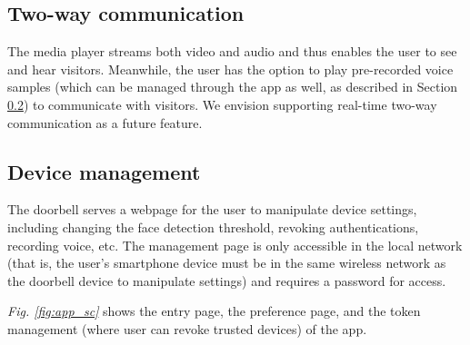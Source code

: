 \subsection{Two-way communication}
The media player streams both video and audio and thus enables the user to see and hear visitors. Meanwhile, the user has the option to play pre-recorded voice samples (which can be managed through the app as well, as described in Section \ref{sec:management}) to communicate with visitors. We envision supporting real-time two-way communication as a future feature.

\subsection{Device management}
\label{sec:management}
The doorbell serves a webpage for the user to manipulate device settings, including changing the face detection threshold, revoking authentications, recording voice, etc. The management page is only accessible in the local network (that is, the user's smartphone device must be in the same wireless network as the doorbell device to manipulate settings) and requires a password for access.

\textit{Fig. \ref{fig:app_sc}} shows the entry page, the preference page, and the token management (where user can revoke trusted devices) of the app.

